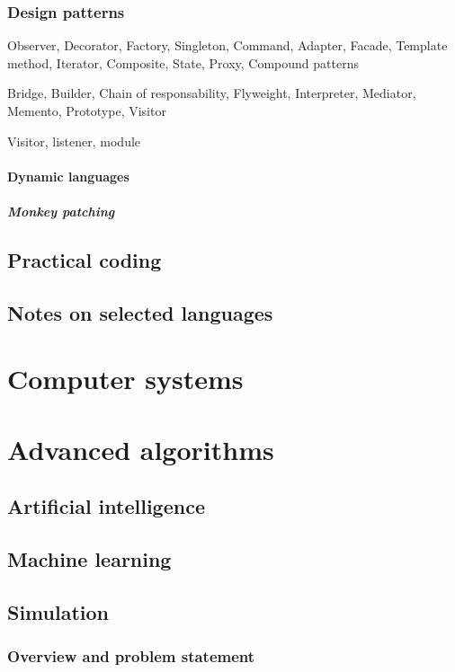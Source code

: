 \documentclass{report}
\begin{document}
\section{Design patterns}
Observer, Decorator, Factory, Singleton, Command, Adapter, Facade, Template method, Iterator, Composite, State, Proxy, Compound patterns

Bridge, Builder, Chain of responsability, Flyweight, Interpreter, Mediator, Memento, Prototype, Visitor

Visitor, listener, module
\subsection{Dynamic languages}
\subsubsection{Monkey patching}

\chapter{Practical coding}


\chapter{Notes on selected languages}


\part{Computer systems}
\setcounter{chapter}{0} %


\part{Advanced algorithms}
\setcounter{chapter}{0} %
\chapter{Artificial intelligence}
\chapter{Machine learning}

\chapter{Simulation}
\section{Overview and problem statement}
\end{document}
